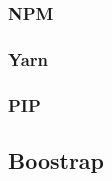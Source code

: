\subsubsection{NPM}
\label{subsubsec:dev-technology-package-managers-npm}

\subsubsection{Yarn}
\label{subsubsec:dev-technology-package-managers-yarn}

\subsubsection{PIP}
\label{subsubsec:dev-technology-package-managers-pip}

\subsection{Boostrap}
\label{subsec:dev-technology-bootstrap}

\endinput